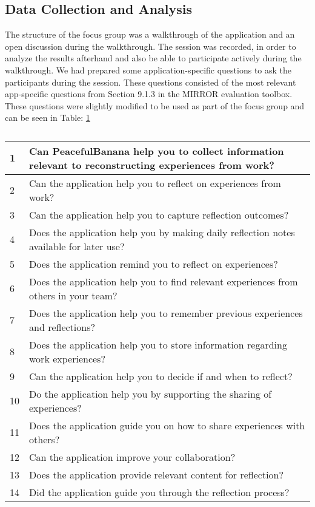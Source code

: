\subsection{Data Collection and Analysis}
The structure of the focus group was a walkthrough of the application and an open discussion during the walkthrough. The session was recorded, in order to analyze the results afterhand and also be able to participate actively during the walkthrough. We had prepared some application-specific questions to ask the participants during the session. These questions consisted of the most relevant app-specific questions from Section 9.1.3 in the MIRROR evaluation toolbox\cite{mirrorevaluation}. These questions were slightly modified to be used as part of the focus group and can be seen in Table: \ref{questiontable}
\begin{table}[H]
    \begin{tabularx}{\textwidth}{|l|X|}
    \hline
    1  & Can PeacefulBanana help you to collect information relevant to reconstructing experiences from work? \\ \hline
    2  & Can the application help you to reflect on experiences from work?                                    \\ \hline
    3  & Can the application help you to capture reflection outcomes?                                         \\ \hline
    4  & Does the application help you by making daily reflection notes available for later use?              \\ \hline
    5  & Does the application remind you to reflect on experiences?                                           \\ \hline
    6  & Does the application help you to find relevant experiences from others in your team?                 \\ \hline
    7  & Does the application help you to remember previous experiences and reflections?                      \\ \hline
    8  & Does the application help you to store information regarding work experiences?                       \\ \hline
    9  & Can the application help you to decide if and when to reflect?                                       \\ \hline
    10 & Do the application help you by supporting the sharing of experiences?                                \\ \hline
    11 & Does the application guide you on how to share experiences with others?                              \\ \hline
    12 & Can the application improve your collaboration?                                                      \\ \hline
    13 & Does the application provide relevant content for reflection?                                        \\ \hline
    14 & Did the application guide you through the reflection process?                                        \\ \hline
    \end{tabularx}
    \caption{}
    \label{questiontable}
\end{table}

